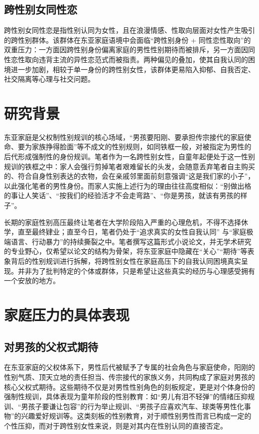 \documentclass[twocolumn]{ctexart}
\begin{document}
\subsection {跨性别女同性恋}
跨性别女同性恋是指性别认同为女性，且在浪漫情感、性取向层面对女性产生吸引的跨性别群体。该群体在东亚家庭语境中会面临“跨性别身份 + 同性恋性取向”的双重压力：一方面因跨性别身份偏离家庭的男性性别期待而被排斥，另一方面因同性恋性取向违背主流的异性恋范式而被指责。两种偏见的叠加，使其自我认同的困境进一步加剧，相较于单一身份的跨性别女性，该群体更易陷入抑郁、自我否定、社交隔离等心理与社交问题\cite{lgbtmental2021health}。

\section {研究背景}
东亚家庭是父权制性别规训的核心场域，“男孩要阳刚、要承担传宗接代的家庭使命、要为家族挣得脸面”等不成文的性别规则，如同铁框一般，对被指定为男性的后代形成强制性的身份规训。笔者作为一名跨性别女性，自童年起便处于这一性别规训的铁框之中：家人会强行剪掉笔者艰难留长的头发，会随意丢弃笔者自主购买的、符合自身性别表达的衣物，会在亲戚邻里面前刻意强调“这是我们家的小子”，以此强化笔者的男性身份。而家人实施上述行为的理由往往高度相似：“别做出格的事让人笑话”、“按我们的经验活才不会走弯路”、“你是男孩，就该有男孩的样子”。

长期的家庭性别高压最终让笔者在大学阶段陷入严重的心理危机，不得不选择休学，直至最终肄业；直至今日，笔者仍处于“追求真实的女性自我认同” 与“家庭极端语言、行动暴力”的持续撕裂之中。笔者撰写这篇形式小说论文，并无学术研究的专业野心，仅希望以论文的结构为骨架，将东亚家庭中隐藏在“关心”“期待”等表象背后的性别规训进行拆解，将跨性别女性在家庭高压下的自我认同困境真实呈现。并非为了批判特定的个体或群体，只是希望让这些真实的经历与心理感受拥有一个安放的地方。

\section {家庭压力的具体表现}
\subsection {对男孩的父权式期待}
在东亚家庭的父权体系下，男性后代被赋予了专属的社会角色与家庭使命，阳刚的性别气质、顶天立地的责任担当、传宗接代的家族义务，共同构成了家庭对男孩的核心父权式期待。这些期待不仅是对男性性别角色的刻板规定，更是对个体身份的强制性规训，具体表现为童年阶段的性别教育：如“男儿有泪不轻弹”的情绪压抑规训、“男孩子要谦让包容”的行为举止规训、“男孩子应喜欢汽车、球类等男性化事物”的兴趣爱好规训等。这类刻板的性别教育，对于顺性别男性而言已构成一定的个性压抑，而对于跨性别女性来说，则是对其内在性别认同的直接否定。
\end{document}
